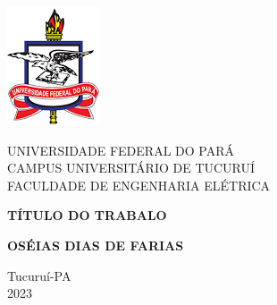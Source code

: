 	\thispagestyle{empty}
	\begin{center}

        \includegraphics[scale=0.5]{Figuras/logoufpa.png}
		
			UNIVERSIDADE FEDERAL DO PARÁ\\
			CAMPUS UNIVERSITÁRIO DE TUCURUÍ\\
			FACULDADE DE ENGENHARIA ELÉTRICA
			
			\vfill 
			
			\textbf{TÍTULO DO TRABALO}
			
			\vfill
			
			\textbf{OSÉIAS DIAS DE FARIAS}
			
			\vfill \vfill
			
	
			Tucuruí-PA\\			
			2023
			
	\end{center}

